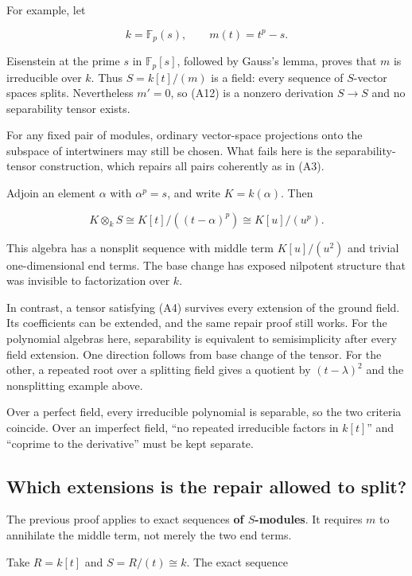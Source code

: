 \documentclass[
  11pt,
]{article}
\begin{document}
For example, let

\[
k=\mathbb F_p(s),\qquad m(t)=t^p-s.
\]

Eisenstein at the prime \(s\) in \(\mathbb F_p[s]\), followed by Gauss's
lemma, proves that \(m\) is irreducible over \(k\). Thus \(S=k[t]/(m)\)
is a field: every sequence of \(S\)-vector spaces splits. Nevertheless
\(m'=0\), so (A12) is a nonzero derivation \(S\to S\) and no
separability tensor exists.

For any fixed pair of modules, ordinary vector-space projections onto
the subspace of intertwiners may still be chosen. What fails here is the
separability-tensor construction, which repairs all pairs coherently as
in (A3).

Adjoin an element \(\alpha\) with \(\alpha^p=s\), and write
\(K=k(\alpha)\). Then

\[
K\otimes_k S\cong K[t]/((t-\alpha)^p)
              \cong K[u]/(u^p).
\]

This algebra has a nonsplit sequence with middle term \(K[u]/(u^2)\) and
trivial one-dimensional end terms. The base change has exposed nilpotent
structure that was invisible to factorization over \(k\).

In contrast, a tensor satisfying (A4) survives every extension of the
ground field. Its coefficients can be extended, and the same repair
proof still works. For the polynomial algebras here, separability is
equivalent to semisimplicity after every field extension. One direction
follows from base change of the tensor. For the other, a repeated root
over a splitting field gives a quotient by \((t-\lambda)^2\) and the
nonsplitting example above.

Over a perfect field, every irreducible polynomial is separable, so the
two criteria coincide. Over an imperfect field, ``no repeated
irreducible factors in \(k[t]\)'' and ``coprime to the derivative'' must
be kept separate.

\subsection{Which extensions is the repair allowed to
split?}\label{which-extensions-is-the-repair-allowed-to-split}

The previous proof applies to exact sequences \textbf{of \(S\)-modules}.
It requires \(m\) to annihilate the middle term, not merely the two end
terms.

Take \(R=k[t]\) and \(S=R/(t)\cong k\). The exact sequence
\end{document}
